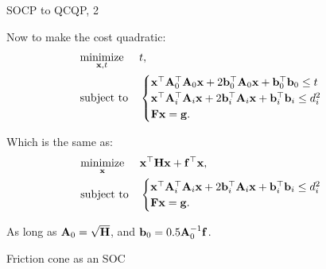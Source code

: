 \documentclass{beamer}
\begin{document}
\begin{frame}{SOCP to QCQP, 2}
\begin{flushleft}


Now to make the cost quadratic:
%
\begin{equation}
\begin{aligned}
& \underset{\mathbf{x}, t}{\text{minimize}}
& & t, \\
& \text{subject to}
& & \begin{cases}
    \mathbf{x}^\top \mathbf{A}_0^\top \mathbf{A}_0 \mathbf{x} + 
    2 \mathbf{b}_0^\top \mathbf{A}_0\mathbf{x} + 
    \mathbf{b}_0^\top \mathbf{b}_0  \leq t\\
    \mathbf{x}^\top \mathbf{A}_i^\top \mathbf{A}_i \mathbf{x} + 
    2 \mathbf{b}_i^\top \mathbf{A}_i\mathbf{x} + 
    \mathbf{b}_i^\top \mathbf{b}_i  \leq d_i^2\\
    \mathbf{F}\mathbf{x} = \mathbf{g}.
    \end{cases}
\end{aligned}
\end{equation}

Which is the same as:
%
\begin{equation}
\begin{aligned}
& \underset{\mathbf{x}}{\text{minimize}}
& & \mathbf{x}^\top \mathbf{H} \mathbf{x} + \mathbf{f}^\top\mathbf{x}, \\
& \text{subject to}
& & \begin{cases}
    \mathbf{x}^\top \mathbf{A}_i^\top \mathbf{A}_i \mathbf{x} + 
    2 \mathbf{b}_i^\top \mathbf{A}_i\mathbf{x} + 
    \mathbf{b}_i^\top \mathbf{b}_i  \leq d_i^2\\
    \mathbf{F}\mathbf{x} = \mathbf{g}.
    \end{cases}
\end{aligned}
\end{equation}

As long as $\mathbf{A}_0 = \sqrt{\mathbf{H}}$, and $\mathbf{b}_0 = 0.5 \mathbf{A}_0^{-1} \mathbf{f}$.

\end{flushleft}
\end{frame}





\begin{frame}
	\centerline{\huge Friction cone as an SOC}
\end{frame}
\end{document}
